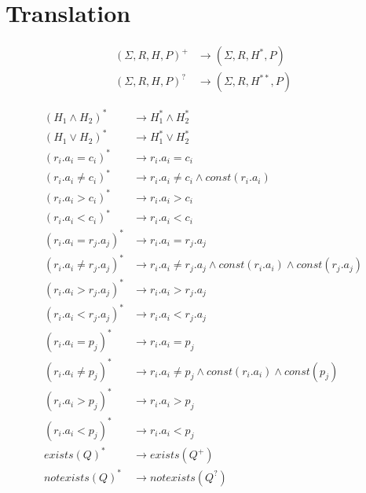 \section{Translation}

\begin{align*}
	(\Sigma,R,H,P)^+ & \rightarrow (\Sigma,R,H^*,P) \\
	(\Sigma,R,H,P)^? & \rightarrow (\Sigma,R,H^{**},P) 
\end{align*}

\begin{align*}
	(H_1 \land H_2)^* & \rightarrow H_1^* \land H_2^* \\
	(H_1 \lor H_2)^* & \rightarrow H_1^* \lor H_2^* \\
	(r_i.a_i = c_i)^* & \rightarrow r_i.a_i = c_i \\
	(r_i.a_i \neq c_i)^*& \rightarrow r_i.a_i \neq c_i \land const(r_i.a_i)\\
	(r_i.a_i > c_i)^*& \rightarrow r_i.a_i > c_i \\
	(r_i.a_i < c_i)^*& \rightarrow r_i.a_i < c_i \\
	(r_i.a_i = r_j.a_j)^* & \rightarrow r_i.a_i = r_j.a_j \\
	(r_i.a_i \neq r_j.a_j)^* & \rightarrow r_i.a_i \neq r_j.a_j \land const(r_i.a_i) \land const(r_j.a_j)\\
	(r_i.a_i > r_j.a_j)^* & \rightarrow r_i.a_i > r_j.a_j \\
	(r_i.a_i < r_j.a_j)^* & \rightarrow r_i.a_i < r_j.a_j \\
	(r_i.a_i = p_j)^* & \rightarrow r_i.a_i = p_j \\
	(r_i.a_i \neq p_j)^* & \rightarrow r_i.a_i \neq p_j \land const(r_i.a_i) \land const(p_j)\\
	(r_i.a_i > p_j)^* & \rightarrow r_i.a_i > p_j \\
	(r_i.a_i < p_j)^* & \rightarrow r_i.a_i < p_j \\
	exists(Q)^* & \rightarrow exists(Q^+) \\
	notexists(Q)^* & \rightarrow notexists(Q^?) \\
\end{align*}

